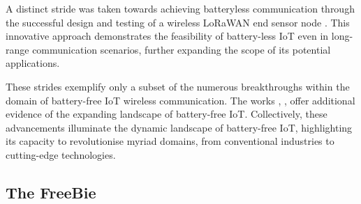 \noindent A distinct stride was taken towards achieving batteryless communication through the successful design and testing of a wireless LoRaWAN end sensor node \cite{9299539}. This innovative approach demonstrates the feasibility of battery-less IoT even in long-range communication scenarios, further expanding the scope of its potential applications.
\vspace{1\baselineskip}

\noindent These strides exemplify only a subset of the numerous breakthroughs within the domain of battery-free IoT wireless communication. The works \cite{9718062}, \cite{10101211}, \cite{10.1145/3276774.3282823} offer additional evidence of the expanding landscape of battery-free IoT. Collectively, these advancements illuminate the dynamic landscape of battery-free IoT, highlighting its capacity to revolutionise myriad domains, from conventional industries to cutting-edge technologies.

\subsection{The FreeBie}
\label{sec:freebie_architecture}

